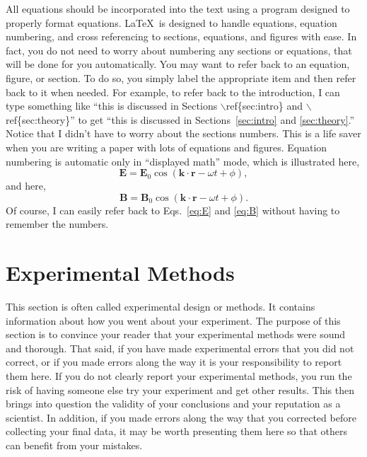 \documentclass[preprint,pre,floats,aps,amsmath,amssymb]{revtex4}
\begin{document}
All equations should be incorporated into the text using a program designed to properly format equations. \LaTeX\ is designed to handle equations, equation numbering, and cross referencing to sections, equations, and figures with ease. In fact, you do not need to worry about numbering any sections or equations, that will be done for you automatically. You may want to refer back to an equation, figure, or section. To do so, you simply label the appropriate item and then refer back to it when needed. For example, to refer back to the introduction, I can type something like ``this is discussed in Sections $\backslash$ref\{sec:intro\} and $\backslash$ref\{sec:theory\}'' to get ``this is discussed in Sections~\ref{sec:intro} and \ref{sec:theory}.'' Notice that I didn't have to worry about the sections numbers. This is a life saver when you are writing a paper with lots of equations and figures. Equation numbering is automatic only in ``displayed math'' mode, which is illustrated here,
\begin{equation}
\textbf{E}=\textbf{E}_0\cos (\textbf{k}\cdot\textbf{r}-\omega t+\phi),
\label{eq:E}
\end{equation}
and here,
\begin{equation}
\textbf{B}=\textbf{B}_0\cos (\textbf{k}\cdot\textbf{r}-\omega t+\phi).
\label{eq:B}
\end{equation}
Of course, I can easily refer back to Eqs.~\ref{eq:E} and \ref{eq:B} without having to remember the numbers.

\section{Experimental Methods}
\label{sec:experiment}

This section is often called experimental design or methods. It contains information about how you went about your experiment. The purpose of this section is to convince your reader that your experimental methods were sound and thorough. That said, if you have made experimental errors that you did not correct, or if you made errors along the way it is your responsibility to report them here. If you do not clearly report your experimental methods, you run the risk of having someone else try your experiment and get other results. This then brings into question the validity of your conclusions and your reputation as a scientist. In addition, if you made errors along the way that you corrected before collecting your final data, it may be worth presenting them here so that others can benefit from your mistakes.
\end{document}
